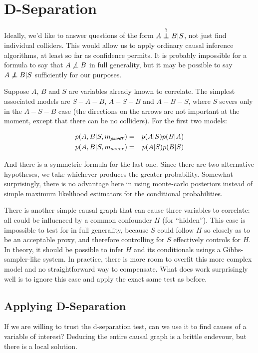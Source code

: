 \documentclass[letterpaper]{article}
\newcommand\indep{\protect\mathpalette{\protect\independenT}{\perp}}
\def\independenT#1#2{\mathrel{\rlap{$#1#2$}\mkern2mu{#1#2}}}
\begin{document}
\section{D-Separation}

Ideally, we'd like to answer questions of the form
$A\overset{?}{\indep}B|S$, not just find individual colliders.
This would allow us to apply ordinary causal inference algorithms, at
least so far as confidence permits.
It is probably
impossible for a formula to say that $A\not\indep B$ in full
generality, but it may be possible to say $A\not\indep B|S$
sufficiently for our purposes.

Suppose $A$, $B$ and $S$ are variables already known to correlate.  The simplest
associated models are $S-A-B$, $A-S-B$ and $A-B-S$, where $S$ severs only in
the $A-S-B$ case (the directions on the arrows are not important at the
moment, except that there can be no colliders).  For the first two
models:

\begin{eqnarray*}
  p(A,B|S,m_{\cancel{sever}}) & = & p(A|S)p(B|A) \\
  p(A,B|S,m_{sever}) & = & p(A|S)p(B|S)
\end{eqnarray*}

And there is a symmetric formula for the last one.  Since there are
two alternative hypotheses, we take whichever produces the greater
probability.  Somewhat surprisingly, there is no advantage here in
using monte-carlo posteriors instead of simple maximum likelihood estimators
for the conditional probabilities.

There is another simple causal graph that can cause three variables to
correlate: all could be influenced by a common confounder $H$ (for
``hidden'').  This case is impossible to test for in full generality,
because $S$ could follow $H$ so closely as to be an acceptable proxy,
and therefore controlling for $S$ effectively controls for $H$.  In
theory, it should be possible to infer $H$ and its conditionals usings
a Gibbs-sampler-like system.  In practice, there is more room to
overfit this more complex model and no straightforward way to
compensate.  What does work surprisingly well is to ignore this case
and apply the exact same test as before.

\subsection{Applying D-Separation}

If we are willing to trust the d-separation test, can we use it to find
causes of a variable of interest?  Deducing the entire causal graph
is a brittle endevour, but there is a local solution.
\end{document}
